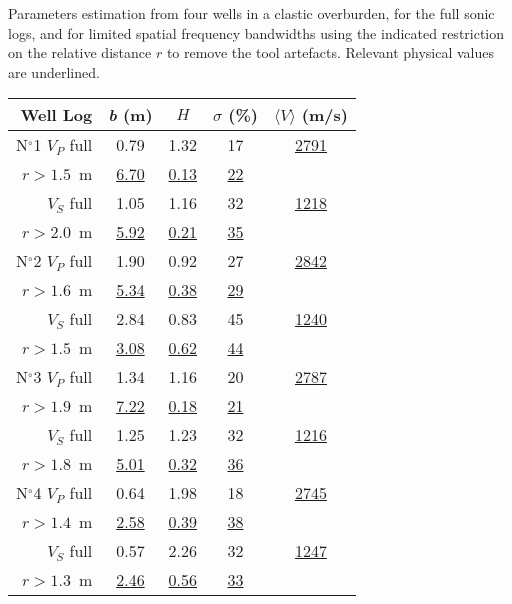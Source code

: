 {Parameters estimation from four wells in a clastic overburden, 
for the full sonic logs, and for limited spatial frequency bandwidths 
using the indicated restriction on the relative distance $r$ to remove the tool artefacts.
Relevant physical values are underlined.}
{
\begin{center}
\begin{tabular}{|r|c|c|c|c|}
      \hline
      {Well} \hfill {Log} & {\it b} (m) & $H$ & $\sigma$ (\%) & {$\langle{V}\rangle$ (m/s)}\\[1mm]
      \hline
N$^{\circ}$1 \hspace{4mm} $V_P$ full & 0.79 & 1.32 & 17 & \underline{2791} \\
            {$r>1.5$~m} & \underline{6.70} & \underline{0.13} & \underline{22} & \\ \cline{2-5}
             $V_S$ full & 1.05 & 1.16 & 32 & \underline{1218} \\
            {$r>2.0$~m} & \underline{5.92} & \underline{0.21} & \underline{35} & \\
      \hline
N$^{\circ}$2 \hfill $V_P$ full & 1.90 & 0.92 & 27 & \underline{2842} \\
              $r>1.6$~m & \underline{5.34} & \underline{0.38} & \underline{29} & \\ \cline{2-5}
             $V_S$ full & 2.84 & 0.83 &  45 & \underline{1240} \\
              $r>1.5$~m & \underline{3.08} & \underline{0.62} & \underline{44} & \\
    \hline
N$^{\circ}$3 \hfill $V_P$ full & 1.34 & 1.16 & 20 & \underline{2787}\\
              $r>1.9$~m & \underline{7.22} & \underline{0.18} & \underline{21} & \\ \cline{2-5}
             $V_S$ full & 1.25 & 1.23 & 32 & \underline{1216} \\
              $r>1.8$~m & \underline{5.01} & \underline{0.32} & \underline{36} & \\
      \hline
N$^{\circ}$4 \hfill $V_P$ full & 0.64 & 1.98 & 18 & \underline{2745} \\
              $r>1.4$~m & \underline{2.58} & \underline{0.39} & \underline{38} & \\ \cline{2-5}
             $V_S$ full & 0.57 & 2.26 & 32 & \underline{1247} \\
              $r>1.3$~m & \underline{2.46} & \underline{0.56} & \underline{33} & \\
     \hline
\end{tabular}
\end{center}
}

